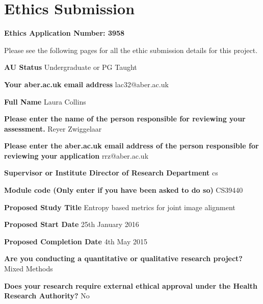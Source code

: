 
\thispagestyle{plain}

\chapter{Ethics Submission}
\label{appendix:ethics}


\textbf{Ethics Application Number: 3958}

\noindent Please see the following pages for all the ethic submission details for this project.


  



\iffalse
\noindent \textbf{AU Status}
Undergraduate or PG Taught

\noindent \textbf{Your aber.ac.uk email address}
lac32@aber.ac.uk

\noindent \textbf{Full Name}
Laura Collins

\noindent \textbf{Please enter the name of the person responsible for reviewing your assessment.}
Reyer Zwiggelaar

\noindent \textbf{Please enter the aber.ac.uk email address of the person responsible for reviewing your application}
rrz@aber.ac.uk

\noindent \textbf{Supervisor or Institute Director of Research Department}
cs

\noindent \textbf{Module code (Only enter if you have been asked to do so)}
CS39440

\noindent \textbf{Proposed Study Title}
Entropy based metrics for joint image alignment

\noindent \textbf{Proposed Start Date}
25th January 2016

\noindent \textbf{Proposed Completion Date}
4th May 2015

\noindent \textbf{Are you conducting a quantitative or qualitative research project?}
Mixed Methods

\noindent \textbf{Does your research require external ethical approval under the Health Research Authority?}
No

